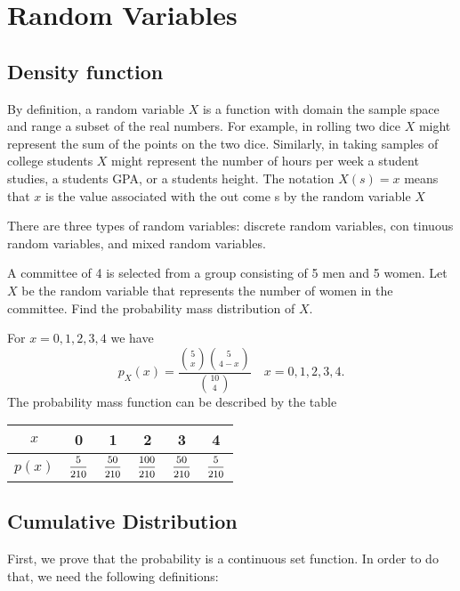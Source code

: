 \chapter{Random Variables}

\section{Density function}

By definition, a random variable $X$ is a function with domain the sample
 space and range a subset of the real numbers. For example, in rolling two
 dice $X$ might represent the sum of the points on the two dice. Similarly, in
 taking samples of college students $X$ might represent the number of hours
 per week a student studies, a students GPA, or a students height.
 The notation $X(s) = x$ means that $x$ is the value associated with the out
come s by the random variable $X$

There are three types of random variables: discrete random variables, con
tinuous random variables, and mixed random variables.

\begin{example}
    A committee of 4 is selected from a group consisting of 5 men and 5 women. 
    Let $X$ be the random variable that represents the number of women in the committee. 
    Find the probability mass distribution of $X$.
\end{example}
\begin{solution}
    For $x = 0, 1,2, 3, 4$ we have 
    \[
        p_X(x) = \frac{\displaystyle {5 \choose x} {5 \choose 4-x}}{\displaystyle {10 \choose 4}} \quad 
        x = 0,1,2,3,4.
    \]
    The probability mass function can be described by the table
    \begin{center}
        \begin{tabular}{c|c|c|c|c|c}
            $x$ & 0 & 1 & 2 & 3 & 4\\
            \hline
            $p(x)$ & $\mfrac{5}{210}$ & $\mfrac{50}{210}$ & $\mfrac{100}{210}$ & $\mfrac{50}{210}$ & $\mfrac{5}{210}$
        \end{tabular}
    \end{center}
\end{solution}

\section{Cumulative Distribution}
First, we prove that the probability is a continuous set function. In order to do that, we 
need the following definitions:

